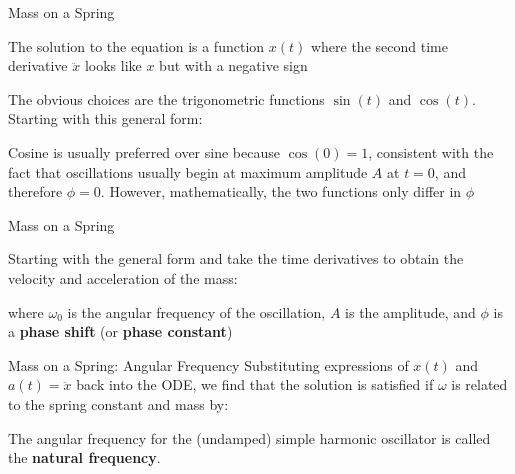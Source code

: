 \documentclass[12pt,compress,aspectratio=169]{beamer}
\begin{document}
\begin{frame}{Mass on a Spring}

  The solution to the equation is a function $x(t)$ where the second time
  derivative $\ddot x$ looks like $x$ but with a negative sign


  The obvious choices are the trigonometric functions $\sin(t)$ and $\cos(t)$.
  Starting with this general form:
    
  
  \vspace{-.1in}Cosine is usually preferred over sine because $\cos(0)=1$,
  consistent with the fact that oscillations usually begin at maximum amplitude
  $A$ at $t=0$, and therefore $\phi=0$. However, mathematically, the two
  functions only differ in $\phi$
\end{frame}


\begin{frame}{Mass on a Spring}

  
  Starting with the general form and take the time derivatives to obtain the
  velocity and acceleration of the mass:
 
  \vspace{-.35in}{\Large
    \begin{align*}
      x(t)&=A\cos(\omega_0 t-\phi)\\
      v(t)&=-A\omega_0\sin(\omega_0 t-\phi)\\
      a(t)&=-A\omega_0^2\cos(\omega_0 t-\phi)=-\omega_0^2x
    \end{align*}
  }
  
  \vspace{-.2in}where $\omega_0$ is the angular frequency of the oscillation,
  $A$ is the amplitude, and $\phi$ is a \textbf{phase shift} (or
  \textbf{phase constant})%
\end{frame}



\begin{frame}{Mass on a Spring: Angular Frequency}
  Substituting expressions of $x(t)$ and $a(t)=\ddot x$ back into the ODE, we
  find that the solution is satisfied if $\omega$ is related to the spring
  constant and mass by:


  The angular frequency for the (undamped) simple harmonic oscillator is called
  the \textbf{natural frequency}.
\end{frame}
\end{document}
